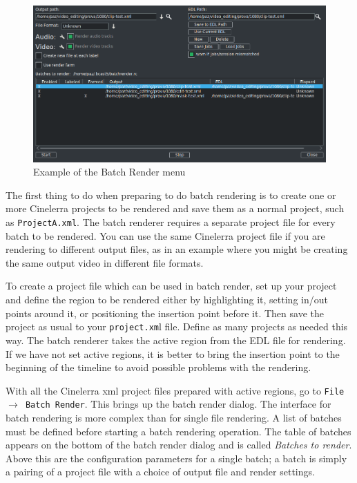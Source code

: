 \begin{figure}[htpb]
    \centering
    \includegraphics[width=0.8\linewidth]{images/batch01.png}
    \caption{Example of the Batch Render menu}
    \label{fig:batch01}
\end{figure}

The first thing to do when preparing to do batch rendering is to create one or more Cinelerra projects to be rendered and save them as a normal project, such as \texttt{ProjectA.xml}.  The batch renderer requires a separate project file for every batch to be rendered.  You can use the same Cinelerra project file if you are rendering to different output files, as in an example where you might be creating the same output video in different file formats.

To create a project file which can be used in batch render, set up your project and define the region to be rendered either by highlighting it, setting in/out points around it, or positioning the insertion point before it. Then save the project as usual to your \texttt{project.xm}l file. Define as many projects as needed this way.  The batch renderer takes the active region from the EDL file for rendering. If we have not set active regions, it is better to bring the insertion point to the beginning of the timeline to avoid possible problems with the rendering.

With all the Cinelerra xml project files prepared with active regions, go to \texttt{File $\rightarrow$ Batch Render}. This brings up the batch render dialog. The interface for batch rendering is more complex than for single file rendering.  A list of batches must be defined before starting a batch rendering operation.  The table of batches appears on the bottom of the batch render dialog and is called \textit{Batches to render}.  Above this are the configuration parameters for a single batch; a batch is simply a pairing of a project file with a choice of output file and render settings.

